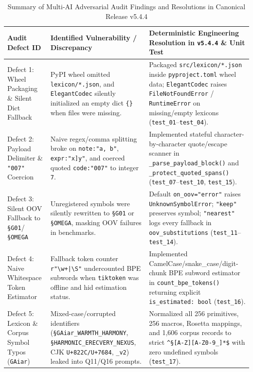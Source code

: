 \documentclass[9pt,a4paper]{extarticle}
\begin{document}
\begin{table}[h!]
\centering
\caption{Summary of Multi-AI Adversarial Audit Findings and Resolutions in Canonical Release v5.4.4}
\label{tab:adversarial_audit}
\footnotesize
\renewcommand{\arraystretch}{0.96}
\setlength{\tabcolsep}{2.5pt}
\begin{tabularx}{\textwidth}{L{2.8cm} L{4.4cm} Y}
\toprule
{}
\textbf{\color{white}Audit Defect ID} &
\textbf{\color{white}Identified Vulnerability / Discrepancy} &
\textbf{\color{white}Deterministic Engineering Resolution in \texttt{v5.4.4} \& Unit Test} \\
\midrule
Defect 1: Wheel Packaging \& Silent Dict Fallback & PyPI wheel omitted \texttt{lexicon/*.json}, and \texttt{ElegantCodec} silently initialized an empty dict \texttt{\{\}} when files were missing. & Packaged \texttt{src/lexicon/*.json} inside \texttt{pyproject.toml} wheel data; \texttt{ElegantCodec} raises \texttt{FileNotFoundError} / \texttt{RuntimeError} on missing/empty lexicons (\texttt{test\_01}--\texttt{test\_04}). \\
Defect 2: Payload Delimiter \& \texttt{"007"} Coercion & Naive regex/comma splitting broke on \texttt{note:"a, b"}, \texttt{expr:"x]y"}, and coerced quoted \texttt{code:"007"} to integer \texttt{7}. & Implemented stateful character-by-character quote/escape scanner in \texttt{\_parse\_\allowbreak payload\_\allowbreak block()} and \texttt{\_protect\_\allowbreak quoted\_\allowbreak spans()} (\texttt{test\_07}--\texttt{test\_10}, \texttt{test\_15}). \\
Defect 3: Silent OOV Fallback to \texttt{\S G01}/\texttt{\S OMEGA} & Unregistered symbols were silently rewritten to \texttt{\S G01} or \texttt{\S OMEGA}, masking OOV failures in benchmarks. & Default \texttt{on\_oov="error"} raises \texttt{UnknownSymbolError}; \texttt{"keep"} preserves symbol; \texttt{"nearest"} logs every fallback in \texttt{oov\_substitutions} (\texttt{test\_11}--\texttt{test\_14}). \\
Defect 4: Naive Whitespace Token Estimator & Fallback token counter \texttt{r"\textbackslash w+|\textbackslash S"} undercounted BPE subwords when \texttt{tiktoken} was offline and hid estimation status. & Implemented CamelCase/snake\_case/digit-chunk BPE subword estimator in \texttt{count\_bpe\_tokens()} returning explicit \texttt{is\_estimated: bool} (\texttt{test\_16}). \\
Defect 5: Lexicon \& Corpus Symbol Typos (\texttt{GAiar}) & Mixed-case/corrupted identifiers (\texttt{\S GAiar\_\allowbreak WARMTH\_\allowbreak HARMONY}, \texttt{\S HARMONIC\_\allowbreak ERECVERY\_\allowbreak NEXUS}, CJK \texttt{U+822C/U+7684}, \texttt{\_v2}) leaked into Q11/Q16 prompts. & Normalized all 256 primitives, 256 macros, Rosetta mappings, and 1,606 corpus records to strict \texttt{\^{}\S[A-Z][A-Z0-9\_]*\$} with zero undefined symbols (\texttt{test\_17}). \\

\end{tabularx}
\end{table}
\end{document}
